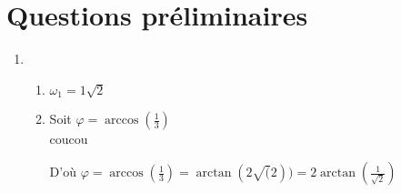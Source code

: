 \section{Questions préliminaires}
\begin{enumerate}
    \item \begin{enumerate}
        \item  $\omega_1 = 1\sqrt{2}$
        \item 
        Soit $\varphi = \arccos{(\frac{1}{3})}$\\
        coucou
        \begin{result}
        D'où $\varphi = \arccos{(\frac{1}{3})} = \arctan{(2\sqrt(2))} = 2\arctan{(\frac{1}{\sqrt{2}})}$
        \end{result}
        
    \end{enumerate}{}
\end{enumerate}{}